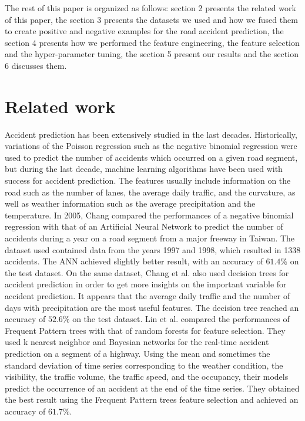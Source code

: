 \documentclass[conference]{IEEEtran}
\begin{document}
The rest of this paper is organized as follows: section 2 presents the related work of this paper, the section 3 presents the datasets we used and how we fused them to create positive and negative examples for the road accident prediction, the section 4 presents how we performed the feature engineering, the feature selection and the hyper-parameter tuning, the section 5 present our results and the section 6 discusses them.

\section{Related work}
Accident prediction has been extensively studied in the last decades.
Historically, variations of the Poisson regression such as the negative binomial regression were used to predict the number of accidents which occurred on a given road segment, but during the last decade, machine learning algorithms have been used with success for accident prediction.
The features usually include information on the road such as the number of lanes, the average daily traffic, and the curvature, as well as weather information such as the average precipitation and the temperature.
In 2005, Chang \cite{Chang2005} compared the performances of a negative binomial regression with that of an Artificial Neural Network to predict the number of accidents during a year on a road segment from a major freeway in Taiwan.
The dataset used contained data from the years 1997 and 1998, which resulted in 1338 accidents.
The ANN achieved slightly better result, with an accuracy of $61.4\%$ on the test dataset.
On the same dataset, Chang et al.\cite{Chang2005b} also used decision trees for accident prediction in order to get more insights on the important variable for accident prediction.
It appears that the average daily traffic and the number of days with precipitation are the most useful features.
The decision tree reached an accuracy of $52.6\%$ on the test dataset.
Lin et al.
\cite{Lin2015} compared the performances of Frequent Pattern trees with that of random forests for feature selection.
They used k nearest neighbor and Bayesian networks for the real-time accident prediction on a segment of a highway.
Using the mean and sometimes the standard deviation of time series corresponding to the weather condition, the visibility, the traffic volume, the traffic speed, and the occupancy, their models predict the occurrence of an accident at the end of the time series.
They obtained the best result using the Frequent Pattern trees feature selection and achieved an accuracy of $61.7\%$.
\end{document}
